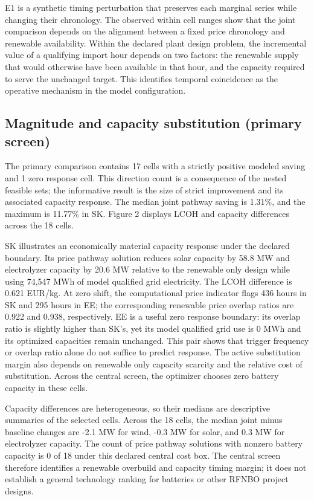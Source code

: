 \documentclass[largeformat]{interact}
\begin{document}
E1 is a synthetic timing perturbation that preserves each marginal
series while changing their chronology. The observed within cell ranges
show that the joint comparison depends on the alignment between a fixed
price chronology and renewable availability. Within the declared plant
design problem, the incremental value of a qualifying import hour
depends on two factors: the renewable supply that would otherwise have
been available in that hour, and the capacity required to serve the
unchanged target. This identifies temporal coincidence as the operative
mechanism in the model configuration.

\subsection{Magnitude and capacity substitution (primary
screen)}\label{magnitude-and-capacity-substitution-primary-screen}

The primary comparison contains 17 cells with a strictly positive
modeled saving and 1 zero response cell. This direction count is a
consequence of the nested feasible sets; the informative result is the
size of strict improvement and its associated capacity response. The
median joint pathway saving is 1.31\%, and the maximum is 11.77\% in SK.
Figure 2 displays LCOH and capacity differences across the 18 cells.

SK illustrates an economically material capacity response under the
declared boundary. Its price pathway solution reduces solar capacity by
58.8 MW and electrolyzer capacity by 20.6 MW relative to the renewable
only design while using 74,547 MWh of model qualified grid electricity.
The LCOH difference is 0.621 EUR/kg. At zero shift, the computational
price indicator flags 436 hours in SK and 295 hours in EE; the
corresponding renewable price overlap ratios are 0.922 and 0.938,
respectively. EE is a useful zero response boundary: its overlap ratio
is slightly higher than SK's, yet its model qualified grid use is 0 MWh
and its optimized capacities remain unchanged. This pair shows that
trigger frequency or overlap ratio alone do not suffice to predict
response. The active substitution margin also depends on renewable only
capacity scarcity and the relative cost of substitution. Across the
central screen, the optimizer chooses zero battery capacity in these
cells.




Capacity differences are heterogeneous, so their medians are descriptive
summaries of the selected cells. Across the 18 cells, the median joint
minus baseline changes are -2.1 MW for wind, -0.3 MW for solar, and 0.3
MW for electrolyzer capacity. The count of price pathway solutions with
nonzero battery capacity is 0 of 18 under this declared central cost
box. The central screen therefore identifies a renewable overbuild and
capacity timing margin; it does not establish a general technology
ranking for batteries or other RFNBO project designs.
\end{document}
